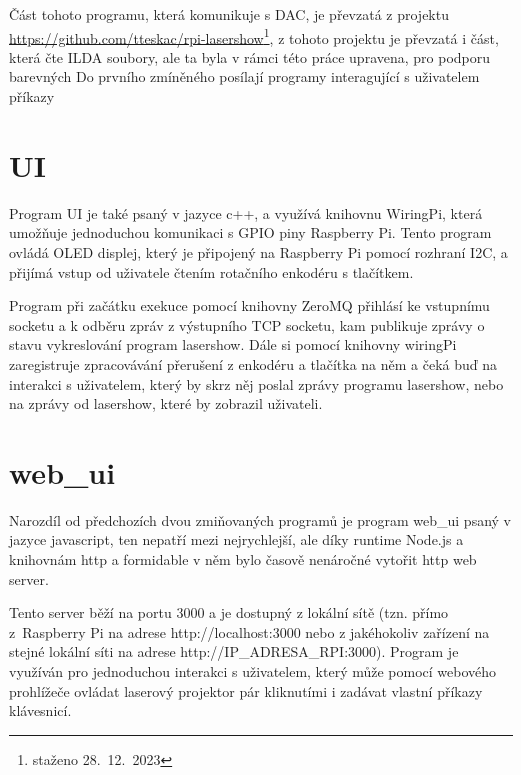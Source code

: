 \documentclass{template/socthesis}
\begin{document}
Část tohoto programu, která komunikuje s DAC, je převzatá z projektu \url{https://github.com/tteskac/rpi-lasershow}\footnote{staženo 28.~12.~2023}, z tohoto projektu je převzatá i část, která čte ILDA soubory, ale ta byla v rámci této práce upravena, pro podporu barevných Do prvního zmíněného posílají programy interagující s uživatelem příkazy






\section{UI}

Program UI je také psaný v jazyce c++, a využívá knihovnu WiringPi, která umožňuje jednoduchou komunikaci s GPIO piny Raspberry Pi. Tento program ovládá OLED displej, který je připojený na Raspberry Pi pomocí rozhraní I2C, a přijímá vstup od uživatele čtením rotačního enkodéru s tlačítkem.

Program při začátku exekuce pomocí knihovny ZeroMQ přihlásí ke vstupnímu socketu a k odběru zpráv z výstupního TCP socketu, kam publikuje zprávy o stavu vykreslování program lasershow. Dále si pomocí knihovny wiringPi zaregistruje zpracovávání přerušení z enkodéru a tlačítka na něm a čeká buď na interakci s uživatelem, který by skrz něj poslal zprávy programu lasershow, nebo na zprávy od lasershow, které by zobrazil uživateli.


\section{web\_ui}

Narozdíl od předchozích dvou zmiňovaných programů je program web\_ui psaný v jazyce javascript, ten nepatří mezi nejrychlejší, ale díky runtime Node.js a knihovnám http a formidable v něm bylo časově nenáročné vytořit http web server.

Tento server běží na portu 3000 a je dostupný z lokální sítě (tzn. přímo z\ Raspberry Pi na adrese http://localhost:3000 nebo z jakéhokoliv zařízení na stejné lokální síti na adrese http://IP\_ADRESA\_RPI:3000).
Program je využíván pro jednoduchou interakci s uživatelem, který může pomocí webového prohlížeče ovládat laserový projektor pár kliknutími i zadávat vlastní příkazy klávesnicí.
\end{document}
